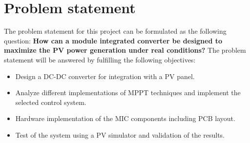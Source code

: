 \section{Problem statement}

The problem statement for this project can be formulated as the following question: \newline
\textbf{How can a module integrated converter be designed to maximize the PV power generation under real conditions?}
\newline
\newline
The problem statement will be answered by fulfilling the following objectives: 

\begin{itemize}
	\item Design a DC-DC converter for integration with a PV panel.
	\item Analyze different implementations of MPPT techniques and implement the selected control system. 
	\item Hardware implementation of the MIC components including PCB layout.
	\item Test of the system using a PV simulator and validation of the results. 
\end{itemize}
